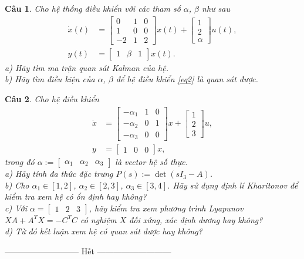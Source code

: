 \documentclass[11pt]{article}
\newtheorem{bt}{Câu}
\def\a{\alpha}
\def\b{\beta}
\newcommand{\m}[1]{
	\begin{bmatrix}
		#1
	\end{bmatrix}
}
\begin{document}
\begin{bt}
	Cho hệ thống điều khiển với các tham số $\a$, $\b$ như sau
	\begin{align}\label{eq2}
		\dot{x}(t) &= \m{0 & 1 & 0 \\ 1 & 0 & 0 \\ -2 & 1 & 2} x(t) + \m{1 \\ 2 \\ \a} u(t), \\
		y(t) &= \m{1 & \b & 1} x(t). 
	\end{align}
	a) Hãy tìm ma trận quan sát Kalman của hệ. \\
	b) Hãy tìm điều kiện của $\a$, $\b$ để hệ điều khiển \eqref{eq2} là quan sát được. \\ 
\end{bt}

\begin{bt}
	Cho hệ điều khiển
	\begin{align}\label{eq4}
		\dot{x} &= \m{-\a_1 & 1 & 0 \\ -\a_2 & 0 & 1 \\ -\a_{3} & 0 & 0 } x + \m{1 \\ 2 \\ 3} u, \\
		y &= \m{1 & 0 & 0} x, 
	\end{align}
	trong đó $\a := \m{\a_1 & \a_2 & \a_3 }$ là vector hệ số thực. \\
	a) Hãy tính đa thức đặc trưng $P(s) := \det(sI_3-A)$. \\
	b) Cho $\a_1 \in [1,2]$, $\a_2 \in [2,3]$, $\a_3 \in [3,4]$. Hãy sử dụng định lí Kharitonov để kiểm tra xem hệ có ổn định hay không? \\
	c) Với $\a = \m{1 & 2 & 3}$, hãy kiểm tra xem phương trình Lyapunov $XA +  A^T X = - C^T C$ có nghiệm $X$ đối xứng, xác định dương hay không?  \\
	d) Từ đó kết luận xem hệ có quan sát được hay không?
\end{bt}   

\begin{center}
	--------------------------- Hết ---------------------------
\end{center}
\end{document}
